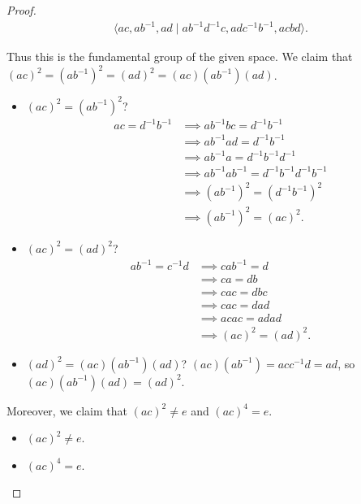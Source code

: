 \documentclass[12pt, psamsfonts]{amsart}
\theoremstyle{definition}
\theoremstyle{remark}
\numberwithin{equation}{section}
\begin{document}
\begin{proof}
  \begin{align*}
    \langle ac, ab^{-1}, ad \mid ab^{-1}d^{-1}c, adc^{-1}b^{-1}, acbd \rangle.
  \end{align*}

  Thus this is the fundamental group of the given space.
  We claim that $(ac)^2 = (ab^{-1})^2 = (ad)^2 = (ac)(ab^{-1})(ad)$.

  \begin{itemize}
    \item
      $(ac)^2 = (ab^{-1})^2$?
      \begin{align*}
        ac = d^{-1}b^{-1}
          &\implies ab^{-1}bc = d^{-1}b^{-1} \\
          &\implies ab^{-1}ad = d^{-1}b^{-1} \\
          &\implies ab^{-1}a = d^{-1}b^{-1}d^{-1} \\
          &\implies ab^{-1}ab^{-1} = d^{-1}b^{-1}d^{-1}b^{-1} \\
          &\implies (ab^{-1})^2 = (d^{-1}b^{-1})^2 \\
          &\implies (ab^{-1})^2 = (ac)^2.
      \end{align*}
    \item
      $(ac)^2 = (ad)^2$?
      \begin{align*}
        ab^{-1} = c^{-1}d
          &\implies cab^{-1} = d \\
          &\implies ca = db \\
          &\implies cac = dbc \\
          &\implies cac = dad \\
          &\implies acac = adad \\
          &\implies (ac)^2 = (ad)^2.
      \end{align*}
    \item
      $(ad)^2 = (ac)(ab^{-1})(ad)$?
      $(ac)(ab^{-1}) = acc^{-1}d = ad$, so $(ac)(ab^{-1})(ad) = (ad)^2$.
  \end{itemize}

  Moreover, we claim that $(ac)^2 \ne e$ and $(ac)^4 = e$.

  \begin{itemize}
    \item
      $(ac)^2 \ne e$.
    \item
      $(ac)^4 = e$.
  \end{itemize}
  
\end{proof}
\end{document}
